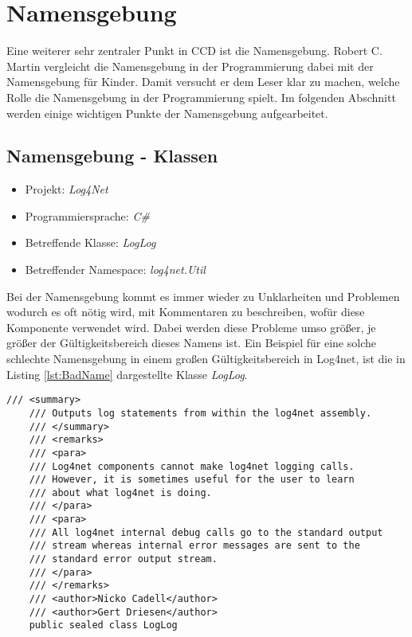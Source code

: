 \section{Namensgebung}

\SuperPar Eine weiterer sehr zentraler Punkt in CCD ist die Namensgebung. Robert C. Martin vergleicht die Namensgebung in der Programmierung dabei mit
der Namensgebung für Kinder. Damit versucht er dem Leser klar zu machen, welche Rolle die Namensgebung in der Programmierung spielt. Im
folgenden Abschnitt werden einige wichtigen Punkte der Namensgebung aufgearbeitet.

\subsection{Namensgebung - Klassen}
\begin{itemize}
	\item Projekt: \textit{Log4Net}
	\item Programmiersprache: \textit{C\#}
	\item Betreffende Klasse: \textit{LogLog}
	\item Betreffender Namespace: \textit{log4net.Util}
\end{itemize}

\SuperPar Bei der Namensgebung kommt es immer wieder zu Unklarheiten und Problemen wodurch es oft nötig wird, mit Kommentaren zu beschreiben, wofür diese Komponente verwendet wird. Dabei werden diese Probleme umso größer, je größer der Gültigkeitsbereich dieses Namens ist. Ein Beispiel für eine solche schlechte Namensgebung in einem großen Gültigkeitsbereich in Log4net, ist die in Listing \ref{lst:BadName} dargestellte Klasse \textit{LogLog}. 

\begin{lstlisting}[language={[Sharp]C}, caption=Beispiele für schlechte Namensgebung, label=lst:BadName]
/// <summary>
	/// Outputs log statements from within the log4net assembly.
	/// </summary>
	/// <remarks>
	/// <para>
	/// Log4net components cannot make log4net logging calls.
	/// However, it is sometimes useful for the user to learn 
	/// about what log4net is doing.
	/// </para>
	/// <para>
	/// All log4net internal debug calls go to the standard output 
	/// stream whereas internal error messages are sent to the 
	/// standard error output stream.
	/// </para>
	/// </remarks>
	/// <author>Nicko Cadell</author>
	/// <author>Gert Driesen</author>
	public sealed class LogLog
\end{lstlisting}

